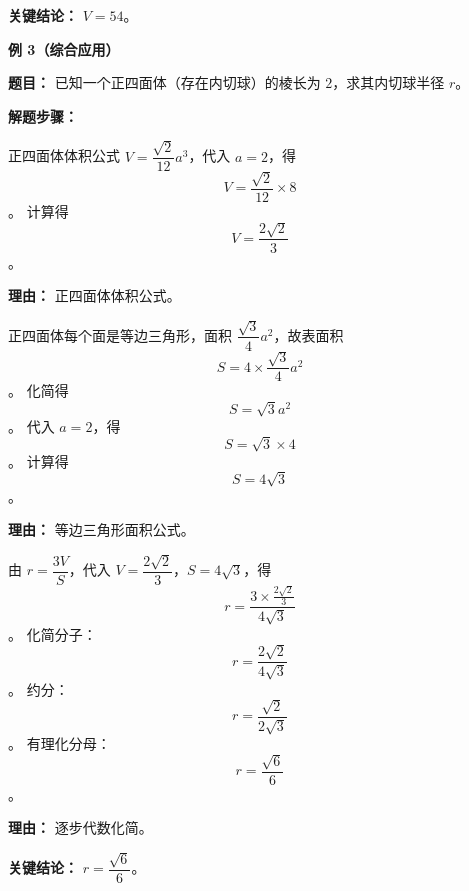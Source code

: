 \begin{examplebox}
	\textbf{\textcolor{CExample}{关键结论：}}
	\textbf{$V = 54$}。

	\medskip
	\textbf{\textcolor{CExample}{例 3（综合应用）}}

	\textbf{\textcolor{CExample}{题目：}}
	已知一个正四面体（存在内切球）的棱长为 $2$，求其内切球半径 $r$。

	\textbf{\textcolor{CExample}{解题步骤：}}
	\begin{description}[style=nextline, leftmargin=2.8em, labelsep=0.5em, itemsep=0.45em]
		\item[\textbf{第一步（求体积）：}] 正四面体体积公式 $V = \dfrac{\sqrt{2}}{12} a^3$，代入 $a=2$，得
			\[
				V = \frac{\sqrt{2}}{12} \times 8
			\]。
			计算得
			\[
				V = \frac{2\sqrt{2}}{3}
			\]。
			\par\textbf{理由：} 正四面体体积公式。
		\item[\textbf{第二步（求表面积）：}] 正四面体每个面是等边三角形，面积 $\dfrac{\sqrt{3}}{4} a^2$，故表面积
			\[
				S = 4 \times \frac{\sqrt{3}}{4} a^2
			\]。
			化简得
			\[
				S = \sqrt{3} a^2
			\]。
			代入 $a=2$，得
			\[
				S = \sqrt{3} \times 4
			\]。
			计算得
			\[
				S = 4\sqrt{3}
			\]。
			\par\textbf{理由：} 等边三角形面积公式。
		\item[\textbf{第三步（套用公式）：}] 由 $r = \dfrac{3V}{S}$，代入 $V = \dfrac{2\sqrt{2}}{3}$，$S = 4\sqrt{3}$，得
			\[
				r = \frac{3 \times \frac{2\sqrt{2}}{3}}{4\sqrt{3}}
			\]。
			化简分子：
			\[
				r = \frac{2\sqrt{2}}{4\sqrt{3}}
			\]。
			约分：
			\[
				r = \frac{\sqrt{2}}{2\sqrt{3}}
			\]。
			有理化分母：
			\[
				r = \frac{\sqrt{6}}{6}
			\]。
			\par\textbf{理由：} 逐步代数化简。
	\end{description}

	\textbf{\textcolor{CExample}{关键结论：}}
	\textbf{$r = \dfrac{\sqrt{6}}{6}$}。
\end{examplebox}
